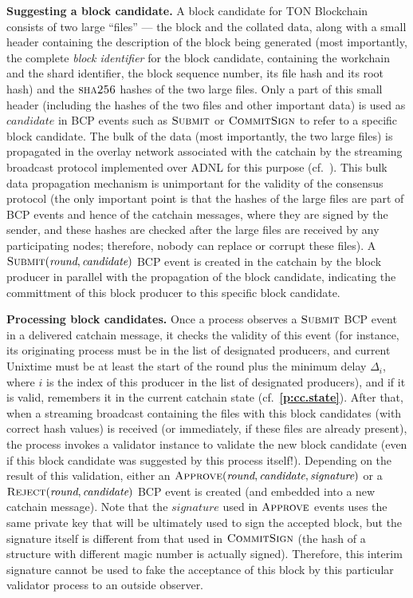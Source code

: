 \documentclass[12pt,oneside]{article}
\def\makepoint#1{\medbreak\noindent{\bf #1.\ }}
\def\nxsubpoint{\refstepcounter{subsubsection}%
  \smallbreak\makepoint{\thesubsubsection}}
\def\refpoint#1{{\rm\textbf{\ref{#1}}}}
\let\ptref=\refpoint
\def\emb#1{\textbf{#1.}}
\let\vr=\textit
\def\opsc#1{\operatorname{\textsc{#1}}}
\def\Sha{\opsc{sha256}}
\def\Submit{\opsc{Submit}}
\def\Approve{\opsc{Approve}}
\def\Reject{\opsc{Reject}}
\def\CommitSign{\opsc{CommitSign}}
\def\wround{\vr{round}}
\def\wcandidate{\vr{candidate}}
\def\wsignature{\vr{signature}}
\begin{document}
\nxsubpoint\emb{Suggesting a block candidate}
A block candidate for TON Block\-chain consists of two large ``files'' --- the block and the collated data, along with a small header containing the description of the block being generated (most importantly, the complete {\em block identifier\/} for the block candidate, containing the workchain and the shard identifier, the block sequence number, its file hash and its root hash) and the $\Sha$ hashes of the two large files. Only a part of this small header (including the hashes of the two files and other important data) is used as $\wcandidate$ in BCP events such as $\Submit$ or $\CommitSign$ to refer to a specific block candidate. The bulk of the data (most importantly, the two large files) is propagated in the overlay network associated with the catchain by the streaming broadcast protocol implemented over ADNL for this purpose (cf.~\cite[5]{TON}). This bulk data propagation mechanism is unimportant for the validity of the consensus protocol (the only important point is that the hashes of the large files are part of BCP events and hence of the catchain messages, where they are signed by the sender, and these hashes are checked after the large files are received by any participating nodes; therefore, nobody can replace or corrupt these files). A $\Submit(\wround,\wcandidate)$ BCP event is created in the catchain by the block producer in parallel with the propagation of the block candidate, indicating the committment of this block producer to this specific block candidate.

\nxsubpoint\emb{Processing block candidates}
Once a process observes a $\Submit$ BCP event in a delivered catchain message, it checks the validity of this event (for instance, its originating process must be in the list of designated producers, and current Unixtime must be at least the start of the round plus the minimum delay $\Delta_i$, where $i$ is the index of this producer in the list of designated producers), and if it is valid, remembers it in the current catchain state (cf.~\ptref{p:cc.state}). After that, when a streaming broadcast containing the files with this block candidates (with correct hash values) is received (or immediately, if these files are already present), the process invokes a validator instance to validate the new block candidate (even if this block candidate was suggested by this process itself!). Depending on the result of this validation, either an $\Approve(\wround,\wcandidate,\wsignature)$ or a $\Reject(\wround,\wcandidate)$ BCP event is created (and embedded into a new catchain message). Note that the $\wsignature$ used in $\Approve$ events uses the same private key that will be ultimately used to sign the accepted block, but the signature itself is different from that used in $\CommitSign$ (the hash of a structure with different magic number is actually signed). Therefore, this interim signature cannot be used to fake the acceptance of this block by this particular validator process to an outside observer.
\end{document}
